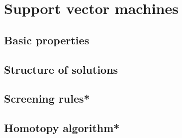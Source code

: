 \chapter{Support vector machines}
\label{chap:svm}


\section{Basic properties}

\section{Structure of solutions}
\label{sec:svm_structure}


\section{Screening rules*}


\section{Homotopy algorithm*}
